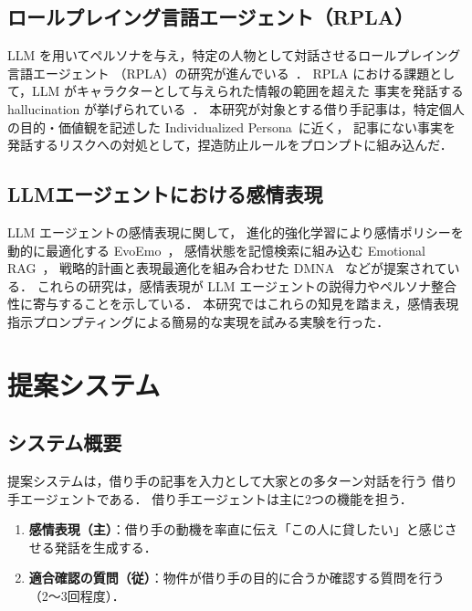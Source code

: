 \documentclass[dvipdfmx]{FITpaper}
\begin{document}
\subsection{ロールプレイング言語エージェント（RPLA）}

LLM を用いてペルソナを与え，特定の人物として対話させるロールプレイング言語エージェント
（RPLA）の研究が進んでいる~\cite{chen2024rpla,tseng2024twotales}．
RPLA における課題として，LLM がキャラクターとして与えられた情報の範囲を超えた
事実を発話する hallucination が挙げられている~\cite{yu2024timechara}．
本研究が対象とする借り手記事は，特定個人の目的・価値観を記述した
Individualized Persona~\cite{chen2024rpla}に近く，
記事にない事実を発話するリスクへの対処として，捏造防止ルールをプロンプトに組み込んだ．

\subsection{LLMエージェントにおける感情表現}

LLM エージェントの感情表現に関して，
進化的強化学習により感情ポリシーを動的に最適化する EvoEmo~\cite{evoemo2025}，
感情状態を記憶検索に組み込む Emotional RAG~\cite{emotionalrag2024}，
戦略的計画と表現最適化を組み合わせた DMNA~\cite{dmna2025} などが提案されている．
これらの研究は，感情表現が LLM エージェントの説得力やペルソナ整合性に寄与することを示している．
本研究ではこれらの知見を踏まえ，感情表現指示プロンプティングによる簡易的な実現を試みる実験を行った．


\section{提案システム}

\subsection{システム概要}

提案システムは，借り手の記事を入力として大家との多ターン対話を行う
借り手エージェントである．
借り手エージェントは主に2つの機能を担う．

\begin{enumerate}
  \item \textbf{感情表現（主）}：借り手の動機を率直に伝え「この人に貸したい」と感じさせる発話を生成する．
  \item \textbf{適合確認の質問（従）}：物件が借り手の目的に合うか確認する質問を行う（2〜3回程度）．
\end{enumerate}
\end{document}
